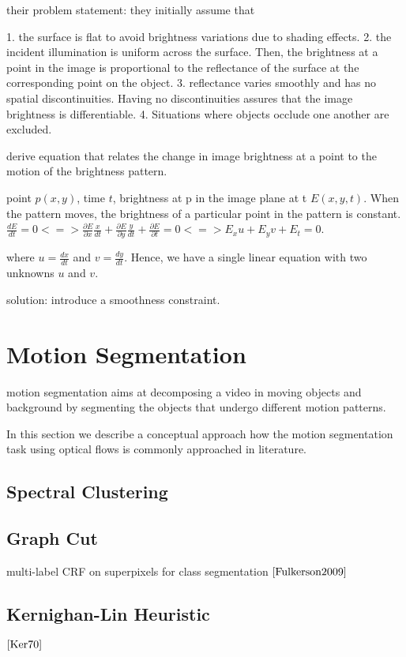 their problem statement:
they initially assume that 

1. the surface is flat to avoid brightness variations due to shading effects.
2. the incident illumination is uniform across the surface. Then, the brightness at a point in the image is proportional to the reflectance of the surface at the corresponding point on the object.
3. reflectance varies smoothly and has no spatial discontinuities. Having no discontinuities assures that the image brightness is differentiable.
4. Situations where objects occlude one another are excluded.

derive equation that relates the change in image brightness at a point to the motion of the brightness pattern.

point $p(x,y)$, time $t$, brightness at p in the image plane at t $E(x,y,t)$.
When the pattern moves, the brightness of a particular point in the pattern is constant. 
$\frac{d E}{dt} = 0 <=> \frac{\partial E}{\partial x} \frac{x}{dt} + \frac{\partial E}{\partial y} \frac{y}{dt} + \frac{\partial E}{\partial t} = 0 <=> E_{x} u + E_{y} v + E_{t} = 0$.

where $u = \frac{dx}{dt}$ and $v = \frac{dy}{dt}$. Hence, we have a single linear equation with two unknowns $u$ and $v$.

solution: introduce a smoothness constraint.


\section{Motion Segmentation}
motion segmentation aims at decomposing a video in moving objects and background by segmenting the objects that undergo different motion patterns.

In this section we describe a conceptual approach how the motion segmentation task using optical flows is commonly approached in literature. 

\subsection{Spectral Clustering}
\subsection{Graph Cut}

multi-label CRF on superpixels for class segmentation $\cite{Fulkerson2009}$

\subsection{Kernighan-Lin Heuristic}


$\cite{Ker70}$

